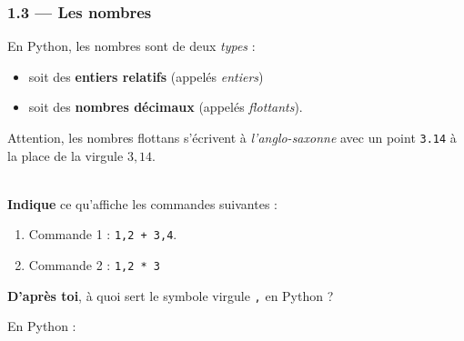 \documentclass[a4paper,17pt]{extarticle}
\newenvironment{eleve}%
{\begin{activite}\color{noiramu}\\[-0.5cm]}
{\end{activite}}
\providecommand{\tightlist}{%
      \setlength{\itemsep}{0pt}\setlength{\parskip}{0pt}}
\begin{document}
    \hypertarget{les-nombres}{%
\subsubsection{1.3 --- Les nombres}\label{les-nombres}}
\begin{retenir}
    En Python, les nombres sont de deux \emph{types} :

\begin{itemize}
\tightlist
\item
  soit des \textbf{entiers relatifs} (appelés \emph{entiers})
\item
  soit des \textbf{nombres décimaux} (appelés \emph{flottants}).
\end{itemize}

        \end{retenir}\begin{remarque}
    Attention, les nombres flottans s'écrivent à \emph{l'anglo-saxonne} avec
un point \texttt{3.14} à la place de la virgule \(3,14\).

        \end{remarque}\begin{eleve}
    \textbf{Indique} ce qu'affiche les commandes suivantes :

\begin{enumerate}
\def\labelenumi{\arabic{enumi}.}
\tightlist
\item
  Commande 1 : \texttt{1,2\ +\ 3,4}.
\item
  Commande 2 : \texttt{1,2\ *\ 3}
\end{enumerate}

\textbf{D'après toi}, à quoi sert le symbole virgule \texttt{,} en
Python ?
        
        \end{eleve}
    En Python :
\end{document}
